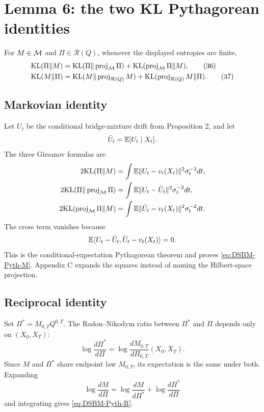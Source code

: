 \section{Lemma 6: the two KL Pythagorean identities}

\begin{lemma}[Lemma 6]
For \(M\in\mathcal{M}\) and \(\Pi\in\mathcal R(Q)\), whenever the displayed entropies are finite,
\begin{align}
 \mathrm{KL}(\Pi\|M)
 &=\mathrm{KL}(\Pi\|\operatorname{proj}_{\mathcal{M}}\Pi)
  +\mathrm{KL}(\operatorname{proj}_{\mathcal{M}}\Pi\|M),
 \tag{36}\label{eq:DSBM-Pyth-M}\\
 \mathrm{KL}(M\|\Pi)
 &=\mathrm{KL}(M\|\operatorname{proj}_{\mathcal R(Q)}M)
  +\mathrm{KL}(\operatorname{proj}_{\mathcal R(Q)}M\|\Pi).
 \tag{37}\label{eq:DSBM-Pyth-R}
\end{align}
\end{lemma}

\subsection{Markovian identity}
Let \(U_t\) be the conditional bridge-mixture drift from Proposition 2, and let
\[
 \bar U_t=\mathbb{E}[U_t\mid X_t].
\]
The three Girsanov formulas are
\begin{align*}
 2\mathrm{KL}(\Pi\|M)
 &=\int\mathbb{E}\|U_t-v_t(X_t)\|^2\sigma_t^{-2}dt,\\
 2\mathrm{KL}(\Pi\|\operatorname{proj}_{\mathcal{M}}\Pi)
 &=\int\mathbb{E}\|U_t-\bar U_t\|^2\sigma_t^{-2}dt,\\
 2\mathrm{KL}(\operatorname{proj}_{\mathcal{M}}\Pi\|M)
 &=\int\mathbb{E}\|\bar U_t-v_t(X_t)\|^2\sigma_t^{-2}dt.
\end{align*}
The cross term vanishes because
\[
 \mathbb{E}\langle U_t-\bar U_t,\bar U_t-v_t(X_t)\rangle=0.
\]
This is the conditional-expectation Pythagorean theorem and proves \eqref{eq:DSBM-Pyth-M}.  Appendix C expands the squares instead of naming the Hilbert-space projection.

\subsection{Reciprocal identity}
Set \(\Pi^*=M_{0,T}Q^{0,T}\).  The Radon--Nikodym ratio between \(\Pi^*\) and \(\Pi\) depends only on \((X_0,X_T)\):
\[
 \log\frac{d\Pi^*}{d\Pi}
 =\log\frac{dM_{0,T}}{d\Pi_{0,T}}(X_0,X_T).
\]
Since \(M\) and \(\Pi^*\) share endpoint law \(M_{0,T}\), its expectation is the same under both.  Expanding
\[
 \log\frac{dM}{d\Pi}
 =\log\frac{dM}{d\Pi^*}+\log\frac{d\Pi^*}{d\Pi}
\]
and integrating gives \eqref{eq:DSBM-Pyth-R}.

